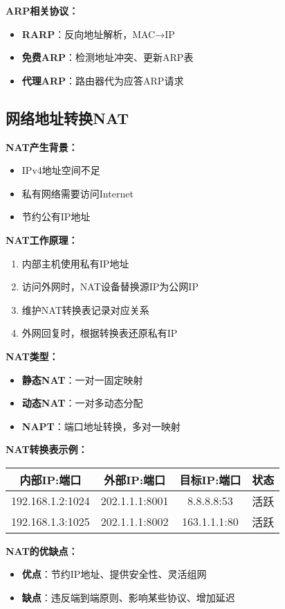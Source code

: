 \documentclass[lang=cn,newtx,10pt,scheme=chinese]{../../elegantbook}
\begin{document}
\textbf{ARP相关协议：}
\begin{itemize}
  \item \textbf{RARP}：反向地址解析，MAC→IP
  \item \textbf{免费ARP}：检测地址冲突、更新ARP表
  \item \textbf{代理ARP}：路由器代为应答ARP请求
\end{itemize}

\subsection{网络地址转换NAT}

\textbf{NAT产生背景：}
\begin{itemize}
  \item IPv4地址空间不足
  \item 私有网络需要访问Internet
  \item 节约公有IP地址
\end{itemize}

\textbf{NAT工作原理：}
\begin{enumerate}
  \item 内部主机使用私有IP地址
  \item 访问外网时，NAT设备替换源IP为公网IP
  \item 维护NAT转换表记录对应关系
  \item 外网回复时，根据转换表还原私有IP
\end{enumerate}

\textbf{NAT类型：}
\begin{itemize}
  \item \textbf{静态NAT}：一对一固定映射
  \item \textbf{动态NAT}：一对多动态分配
  \item \textbf{NAPT}：端口地址转换，多对一映射
\end{itemize}

\textbf{NAT转换表示例：}
\begin{center}
\begin{tabular}{|c|c|c|c|}
\hline
\textbf{内部IP:端口} & \textbf{外部IP:端口} & \textbf{目标IP:端口} & \textbf{状态} \\
\hline
192.168.1.2:1024 & 202.1.1.1:8001 & 8.8.8.8:53 & 活跃 \\
192.168.1.3:1025 & 202.1.1.1:8002 & 163.1.1.1:80 & 活跃 \\
\hline
\end{tabular}
\end{center}

\textbf{NAT的优缺点：}
\begin{itemize}
  \item \textbf{优点}：节约IP地址、提供安全性、灵活组网
  \item \textbf{缺点}：违反端到端原则、影响某些协议、增加延迟
\end{itemize}
\end{document}
